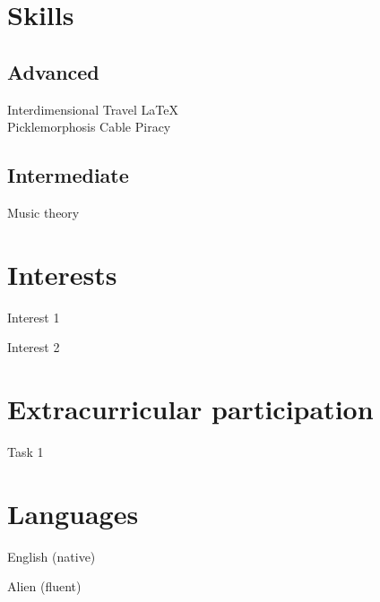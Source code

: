 \documentclass{jjcv}
\begin{document}
\begin{minipage}[t]{0.35\textwidth}

\section{Skills}
\subsection{Advanced}
\begin{indentbox}[0.5em]
Interdimensional Travel \qquad \LaTeX \\
Picklemorphosis \qquad Cable Piracy
\end{indentbox}
\subsection{Intermediate}
\begin{indentbox}[0.5em]
Music theory
\end{indentbox}

\section{Interests}
\begin{indentbox}
\item Interest 1
\item Interest 2
\end{indentbox}

\section{Extracurricular participation}
\begin{indentbox}
\item Task 1
\end{indentbox}

\section{Languages}
\begin{indentbox}
\item English (native)
\item Alien (fluent)
\end{indentbox}
\end{minipage}
\end{document}
